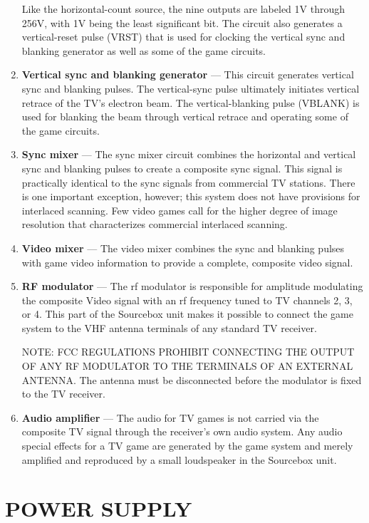 \documentclass[11pt]{book}              %
\begin{document}
\begin{enumerate}
Like the horizontal-count source, the nine outputs are labeled 1V through 256V, with 1V being the least significant bit. The circuit also generates a vertical-reset pulse (VRST) that is used for clocking the vertical sync and blanking generator as well as some of the game circuits.

\item \textbf{Vertical sync and blanking generator} — This circuit generates vertical sync and blanking pulses. The vertical-sync pulse ultimately initiates vertical retrace of the TV’s electron beam. The vertical-blanking pulse (VBLANK) is used for blanking the beam through vertical retrace and operating some of the game circuits.

\item \textbf{Sync mixer} — The sync mixer circuit combines the horizontal and vertical sync and blanking pulses to create a composite sync signal. This signal is practically identical to the sync signals from commercial TV stations. There is one important exception, however; this system does not have provisions for interlaced scanning. Few video games call for the higher degree of image resolution that characterizes commercial interlaced scanning.

\item \textbf{Video mixer} — The video mixer combines the sync and blanking pulses with game video information to provide a complete, composite video signal.

\item \textbf{RF modulator} — The rf modulator is responsible for amplitude modulating the composite Video signal with an rf frequency tuned to TV channels 2, 3, or 4. This part of the Sourcebox unit makes it possible to connect the game system to the VHF antenna terminals of any standard TV receiver.

NOTE: FCC REGULATIONS PROHIBIT CONNECTING THE OUTPUT OF ANY RF MODULATOR TO THE TERMINALS OF AN EXTERNAL ANTENNA. The antenna must be disconnected before the modulator is fixed to the TV receiver.

\item \textbf{Audio amplifier} — The audio for TV games is not carried via the composite TV signal through the receiver’s own audio system. Any audio special effects for a TV game are generated by the game system and merely amplified and reproduced by a small loudspeaker in the Sourcebox unit.
\end{enumerate}

\section{POWER SUPPLY}
\end{document}
